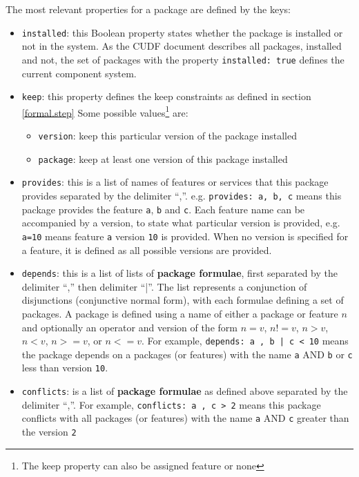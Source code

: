 The most relevant properties for a package are defined by the keys:
\begin{itemize}
  \item \verb+installed+: this Boolean property states whether the package is installed or not in the system. 
  As the CUDF document describes all packages, installed and not, the set of packages with the property \verb+installed: true+ defines the current component system.
  \item \verb+keep+: this property defines the keep constraints as defined in section \ref{formal.step}
  Some possible values\footnote{The keep property can also be assigned feature or none} are:
	  	\begin{itemize}
	  		\item \verb+version+: keep this particular version of the package installed
	  		\item \verb+package+: keep at least one version of this package installed
		\end{itemize}
  \item \verb+provides+: this is a list of names of features or services that this package provides separated by the delimiter ``,''.
  e.g. \verb+provides: a, b, c+ means this package provides the feature \verb+a+, \verb+b+ and \verb+c+.
  Each feature name can be accompanied by a version, to state what particular version is provided, e.g. \verb+a=10+ means feature \verb+a+ version \verb+10+ is provided.
  When no version is specified for a feature, it is defined as all possible versions are provided.
  \item \verb+depends+: this is a list of lists of \textbf{package formulae}, first separated by the delimiter ``,'' then delimiter ``|''.
  The list represents a conjunction of disjunctions (conjunctive normal form), with each formulae defining a set of packages.
  A package is defined using a name of either a package or feature $n$ and optionally an operator and version of the form  $n = v$, $n != v$, $n > v$, $n < v$, $n >= v$, or $n <= v$.
  For example, \verb+depends: a , b | c < 10+ means the package depends on a packages (or features) with the name \verb+a+ AND \verb+b+ or \verb+c+ less than version \verb+10+.  
  \item \verb+conflicts+: is a list of \textbf{package formulae} as defined above separated by the delimiter ``,''.
  For example, \verb+conflicts: a , c > 2+ means this package conflicts with all packages (or features) with the name \verb+a+ AND \verb+c+ greater than the version \verb+2+
\end{itemize}

